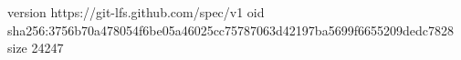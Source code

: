 version https://git-lfs.github.com/spec/v1
oid sha256:3756b70a478054f6be05a46025cc75787063d42197ba5699f6655209dedc7828
size 24247
